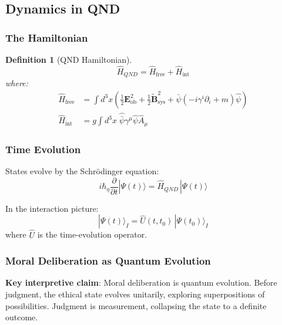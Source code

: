 \documentclass[12pt]{article}
\newtheorem{definition}{Definition}[section]
\begin{document}
\subsection{Dynamics in QND}

\subsubsection{The Hamiltonian}

\begin{definition}[QND Hamiltonian]
\begin{equation}
    \hat{H}_{QND} = \hat{H}_{\text{free}} + \hat{H}_{\text{int}}
\end{equation}
where:
\begin{align}
    \hat{H}_{\text{free}} &= \int d^3x \left( \frac{1}{2} \mathbf{E}_{\text{ob}}^2 + \frac{1}{2} \tilde{\mathbf{B}}_{\text{sys}}^2 + \bar{\psi}(-i\gamma^i \partial_i + m)\hat{\psi} \right) \\
    \hat{H}_{\text{int}} &= g \int d^3x \; \hat{\bar{\psi}} \gamma^\mu \hat{\psi} \hat{A}_\mu
\end{align}
\end{definition}

\subsubsection{Time Evolution}

States evolve by the Schr\"{o}dinger equation:
\begin{equation}
    i\hbar_\eta \frac{\partial}{\partial t} |\Psi(t)\rangle = \hat{H}_{QND} \,|\Psi(t)\rangle
\end{equation}

In the interaction picture:
\begin{equation}
    |\Psi(t)\rangle_I = \hat{U}(t, t_0) \,|\Psi(t_0)\rangle_I
\end{equation}
where $\hat{U}$ is the time-evolution operator.

\subsubsection{Moral Deliberation as Quantum Evolution}

\textbf{Key interpretive claim}: Moral deliberation is quantum evolution. Before judgment, the ethical state evolves unitarily, exploring superpositions of possibilities. Judgment is measurement, collapsing the state to a definite outcome.
\end{document}
